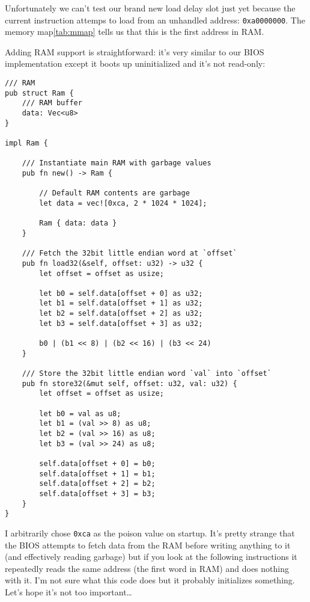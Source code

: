 \documentclass[a4paper]{article}
\newcommand{\code}[1] {\texttt{#1}}
\begin{document}
\label{sec:ram}

Unfortunately we can't test our brand new load delay slot just yet
because the current instruction attemps to load from an unhandled
address: \code{0xa0000000}. The memory map\ref{tab:mmap} tells us that
this is the first address in RAM.

Adding RAM support is straightforward: it's very similar to our BIOS
implementation except it boots up uninitialized and it's not
read-only:

\begin{lstlisting}
/// RAM
pub struct Ram {
    /// RAM buffer
    data: Vec<u8>
}

impl Ram {

    /// Instantiate main RAM with garbage values
    pub fn new() -> Ram {

        // Default RAM contents are garbage
        let data = vec![0xca, 2 * 1024 * 1024];

        Ram { data: data }
    }

    /// Fetch the 32bit little endian word at `offset`
    pub fn load32(&self, offset: u32) -> u32 {
        let offset = offset as usize;

        let b0 = self.data[offset + 0] as u32;
        let b1 = self.data[offset + 1] as u32;
        let b2 = self.data[offset + 2] as u32;
        let b3 = self.data[offset + 3] as u32;

        b0 | (b1 << 8) | (b2 << 16) | (b3 << 24)
    }

    /// Store the 32bit little endian word `val` into `offset`
    pub fn store32(&mut self, offset: u32, val: u32) {
        let offset = offset as usize;

        let b0 = val as u8;
        let b1 = (val >> 8) as u8;
        let b2 = (val >> 16) as u8;
        let b3 = (val >> 24) as u8;

        self.data[offset + 0] = b0;
        self.data[offset + 1] = b1;
        self.data[offset + 2] = b2;
        self.data[offset + 3] = b3;
    }
}
\end{lstlisting}

I arbitrarily chose \code{0xca} as the poison value on startup. It's pretty
strange that the BIOS attempts to fetch data from the RAM before
writing anything to it (and effectively reading garbage) but if you
look at the following instructions it repeatedly reads the same
address (the first word in RAM) and does nothing with it. I'm not sure
what this code does but it probably initializes something. Let's hope
it's not too important\dots{}
\end{document}
